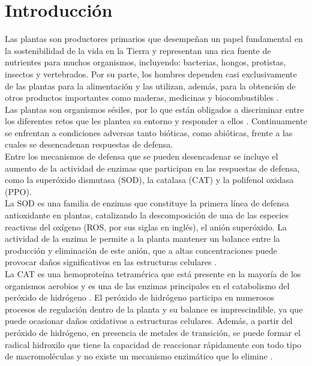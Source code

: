 
\chapter*{Introducción}  

Las plantas son productores primarios que desempe\~nan un papel fundamental en la sostenibilidad de la vida en la Tierra \citep{mithofer2016general} y representan una rica fuente de nutrientes para muchos organismos, incluyendo: bacterias, hongos, protistas, insectos y vertebrados. Por su parte, los hombres dependen casi exclusivamente de las plantas para la alimentaci\'on y las utilizan, adem\'as, para la obtenci\'on de otros productos importantes como maderas, medicinas y biocombustibles \citep{freeman2008overview}.\\

Las plantas son organismos s\'esiles, por lo que est\'an obligados a discriminar entre los diferentes retos que les plantea su entorno y responder a ellos \citep{vivanco2005mecanismos}. Continuamente se enfrentan a condiciones adversas tanto bióticas, como abióticas, frente a las cuales se desencadenan respuestas de defensa. \\

Entre los mecanismos de defensa que se pueden desencadenar se incluye el aumento de la actividad de enzimas que participan en las respuestas de defensa, como la super\'oxido dismutasa (SOD), la catalasa (CAT) y la polifenol oxidasa (PPO).\\

La SOD es una familia de enzimas que constituye la primera l\'inea de defensa antioxidante en plantas, catalizando la descomposici\'on de una de las especies reactivas del ox\'igeno (ROS, por sus siglas en ingl\'es), el ani\'on super\'oxido. La actividad de la enzima le permite a la planta mantener un balance entre la producci\'on y eliminaci\'on de este ani\'on, que a altas concentraciones puede provocar da\~nos significativos en las estructuras celulares \citep{gill2015superoxide}.\\
 
La CAT es una hemoprote\'ina tetram\'erica que est\'a presente en la mayor\'ia de los organismos aerobios y es una de las enzimas principales en el catabolismo del per\'oxido de hidr\'ogeno \citep{luhova2003activities}. El per\'oxido de hidr\'ogeno participa en numerosos procesos de regulaci\'on dentro de la planta \citep{xie2019roles} y su balance es imprescindible, ya que puede ocasionar da\~nos oxidativos a estructuras celulares. Adem\'as, a partir del per\'oxido de hidr\'ogeno, en presencia de metales de transici\'on, se puede formar el radical hidroxilo que tiene la capacidad de reaccionar rápidamente con todo tipo de macromoléculas y no existe un mecanismo enzimático que lo elimine \citep{moller2007oxidative}.  \\


